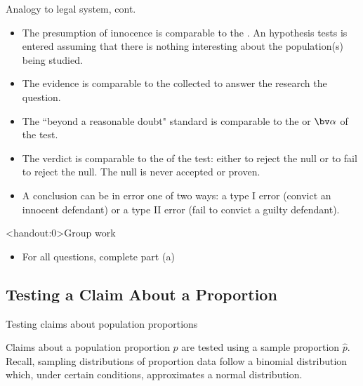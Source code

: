 \documentclass[xcolor=table, handout]{beamer}
\begin{document}
\begin{frame}{Analogy to legal system, cont.}
\begin{block}{}
\large
\begin{itemize}
\item The presumption of innocence is comparable to the . An hypothesis tests is entered assuming that there is nothing interesting about the population(s) being studied.
\pause\item The evidence is comparable to the  collected to answer the research the question.
\pause\item The ``beyond a reasonable doubt" standard is comparable to the  or $\bv \alpha$ of the test.
\pause\item The verdict is comparable to the  of the test: either to reject the null or to fail to reject the null. The null is never accepted or proven.
\pause\item A conclusion can be in error one of two ways: a type I error (convict an innocent defendant) or a type II error (fail to convict a guilty defendant).
\end{itemize}
\end{block}
\end{frame}

\begin{frame}<handout:0>{Group work}
\begin{block}{}
\large
\begin{itemize}
\item For all questions, complete part (a)
\end{itemize}
\end{block}
\end{frame}


\subsection{Testing a Claim About a Proportion}

\begin{frame}{Testing claims about population proportions}
\begin{block}{}
\large
Claims about a population proportion $p$ are tested using a sample proportion $\hat p$.\\
\medskip
Recall, sampling distributions of proportion data follow a binomial distribution which, under certain conditions, approximates a normal distribution.\\
\end{block}
\end{frame}
\end{document}
